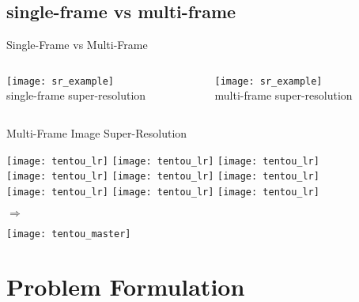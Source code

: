 \documentclass[fleqn,aspectratio=1610]{beamer}
\begin{document}
\subsection{single-frame vs multi-frame}
\label{sec:orgea51f85}
\begin{frame}[label={sec:org9a01b38}]{Single-Frame vs Multi-Frame}
\begin{columns}
\begin{column}{0.43\columnwidth}
\begin{center}
\texttt{[image: sr\_example]} \\[0pt]
single-frame super-resolution
\end{center}
\end{column}
\begin{column}{0.57\columnwidth}
\begin{center}
\texttt{[image: sr\_example]} \\[0pt]
multi-frame super-resolution
\end{center}
\end{column}
\end{columns}
\end{frame}

\begin{frame}[label={sec:org2ef4483}]{Multi-Frame Image Super-Resolution}
\begin{center}
\parbox[c]{.56\textwidth}{
  \texttt{[image: tentou\_lr]}
  \texttt{[image: tentou\_lr]}
  \texttt{[image: tentou\_lr]}\\
  \texttt{[image: tentou\_lr]}
  \texttt{[image: tentou\_lr]}
  \texttt{[image: tentou\_lr]}\\
  \texttt{[image: tentou\_lr]}
  \texttt{[image: tentou\_lr]}
  \texttt{[image: tentou\_lr]}
}
\alert{\(\Longrightarrow\)}
\parbox[c]{.3\textwidth}{
  \texttt{[image: tentou\_master]}}
\end{center}
\end{frame}

\section{Problem Formulation}
\label{sec:orgdcd11f5}
\end{document}
